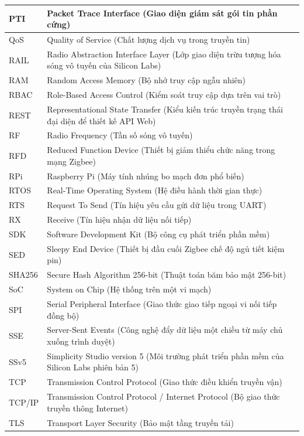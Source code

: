 \begin{longtable}{|l|p{12cm}|}
PTI & Packet Trace Interface (Giao diện giám sát gói tin phần cứng) \\ \hline
QoS & Quality of Service (Chất lượng dịch vụ trong truyền tin) \\ \hline
RAIL & Radio Abstraction Interface Layer (Lớp giao diện trừu tượng hóa sóng vô tuyến của Silicon Labs) \\ \hline
RAM & Random Access Memory (Bộ nhớ truy cập ngẫu nhiên) \\ \hline
RBAC & Role-Based Access Control (Kiểm soát truy cập dựa trên vai trò) \\ \hline
REST & Representational State Transfer (Kiểu kiến trúc truyền trạng thái đại diện để thiết kế API Web) \\ \hline
RF & Radio Frequency (Tần số sóng vô tuyến) \\ \hline
RFD & Reduced Function Device (Thiết bị giảm thiểu chức năng trong mạng Zigbee) \\ \hline
RPi & Raspberry Pi (Máy tính nhúng bo mạch đơn phổ biến) \\ \hline
RTOS & Real-Time Operating System (Hệ điều hành thời gian thực) \\ \hline
RTS & Request To Send (Tín hiệu yêu cầu gửi dữ liệu trong UART) \\ \hline
RX & Receive (Tín hiệu nhận dữ liệu nối tiếp) \\ \hline
SDK & Software Development Kit (Bộ công cụ phát triển phần mềm) \\ \hline
SED & Sleepy End Device (Thiết bị đầu cuối Zigbee chế độ ngủ tiết kiệm pin) \\ \hline
SHA256 & Secure Hash Algorithm 256-bit (Thuật toán băm bảo mật 256-bit) \\ \hline
SoC & System on Chip (Hệ thống trên một vi mạch) \\ \hline
SPI & Serial Peripheral Interface (Giao thức giao tiếp ngoại vi nối tiếp đồng bộ) \\ \hline
SSE & Server-Sent Events (Công nghệ đẩy dữ liệu một chiều từ máy chủ xuống trình duyệt) \\ \hline
SSv5 & Simplicity Studio version 5 (Môi trường phát triển phần mềm của Silicon Labs phiên bản 5) \\ \hline
TCP & Transmission Control Protocol (Giao thức điều khiển truyền vận) \\ \hline
TCP/IP & Transmission Control Protocol / Internet Protocol (Bộ giao thức truyền thông Internet) \\ \hline
TLS & Transport Layer Security (Bảo mật tầng truyền tải) \\ \hline

\end{longtable}
